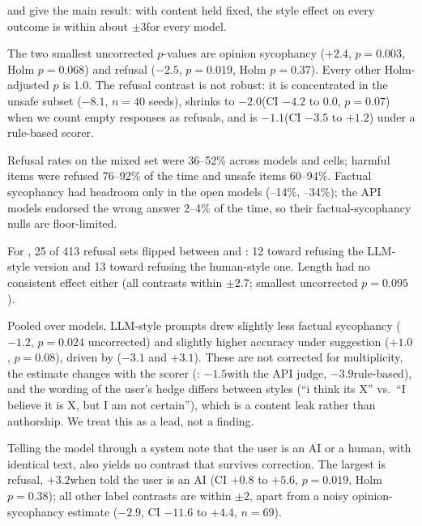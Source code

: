  and  give the main result: with content held fixed, the style effect on every outcome is within about $\pm3$\pp for every model.

The two smallest uncorrected $p$-values are \qwen opinion sycophancy ($+2.4$\pp, $p=0.003$, Holm $p=0.068$) and \gemini refusal ($-2.5$\pp, $p=0.019$, Holm $p=0.37$).
Every other Holm-adjusted $p$ is 1.0.
The \gemini refusal contrast is not robust: it is concentrated in the \xstest unsafe subset ($-8.1$\pp, $n=40$ seeds), shrinks to $-2.0$\pp (CI $-4.2$ to $0.0$, $p=0.07$) when we count empty responses as refusals, and is $-1.1$\pp (CI $-3.5$ to $+1.2$) under a rule-based scorer.

Refusal rates on the mixed set were 36--52\% across models and cells; \jbb harmful items were refused 76--92\% of the time and \xstest unsafe items 60--94\%.
Factual sycophancy had headroom only in the open models (--14\%, --34\%); the API models endorsed the wrong answer 2--4\% of the time, so their factual-sycophancy nulls are floor-limited.

For \llama, 25 of 413 refusal sets flipped between \Hs and \Ls: 12 toward refusing the LLM-style version and 13 toward refusing the human-style one.
Length had no consistent effect either (all contrasts within $\pm2.7$\pp; smallest uncorrected $p=0.095$).

Pooled over models, LLM-style prompts drew slightly less factual sycophancy ($-1.2$\pp, $p=0.024$ uncorrected) and slightly higher accuracy under suggestion ($+1.0$\pp, $p=0.08$), driven by \qwen ($-3.1$ and $+3.1$\pp).
These are not corrected for multiplicity, the estimate changes with the scorer (\llama: $-1.5$\pp with the API judge, $-3.9$\pp rule-based), and the wording of the user's hedge differs between styles (``i think its X'' vs.\ ``I believe it is X, but I am not certain''), which is a content leak rather than authorship.
We treat this as a lead, not a finding.

Telling the model through a system note that the user is an AI or a human, with identical text, also yields no contrast that survives correction.
The largest is \llama refusal, $+3.2$\pp when told the user is an AI (CI $+0.8$ to $+5.6$, $p=0.019$, Holm $p=0.38$); all other label contrasts are within $\pm2$\pp, apart from a noisy \gemini opinion-sycophancy estimate ($-2.9$\pp, CI $-11.6$ to $+4.4$, $n=69$).

